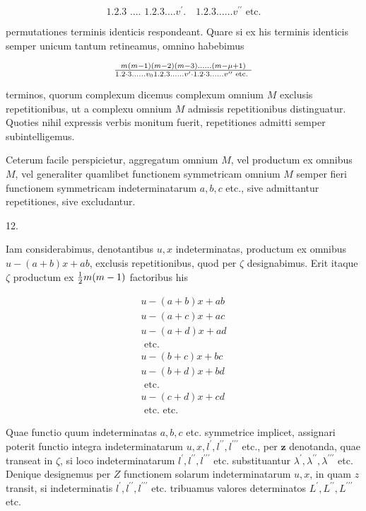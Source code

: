\documentclass[twoside,12pt, showframe]{memoir}
\let\oldfrac\frac
\def\frac#1#2{\mathchoice{\tfrac{#1}{#2}}{\oldfrac{#1}{#2}}{\genfrac{}{}{}{2}{#1}{#2\mathstrut}}{\genfrac{}{}{}{3}{#1}{#2\mathstrut}}}
\begin{document}
\[
\text { 1.2.3 .... } 1.2 .3 \ldots . v^{\prime} . \quad 1.2 .3 \ldots \ldots v^{\prime \prime} \text { etc. }
\]

permutationes terminis identicis respondeant. Quare si ex his terminis identicis semper unicum tantum retineamus, omnino habebimus

\[
\frac{m(m-1)(m-2)(m-3) \ldots \ldots(m-\mu+1)}{1.2 \cdot 3 \ldots \ldots v_{0} 1.2 .3 \ldots \ldots v^{\prime} \cdot 1.2 \cdot 3 \ldots \ldots v^{\prime \prime} \text { etc. }}
\]

terminos, quorum complexum dicemus complexum omnium \(M\) exclusis repetitionibus, ut a complexu omnium \(M\) admissis repetitionibus distinguatur. Quoties nihil expressis verbis monitum fuerit, repetitiones admitti semper subintelligemus.

Ceterum facile perspicietur, aggregatum omnium \(M\), vel productum ex omnibus \(M\), vel generaliter quamlibet functionem symmetricam omnium \(M\) semper fieri functionem symmetricam indeterminatarum \(a, b, c\) etc., sive admittantur repetitiones, sive excludantur.

12.

Iam considerabimus, denotantibus \(u, x\) indeterminatas, productum ex omnibus \(u-(a+b) x+a b\), exclusis repetitionibus, quod per \(\zeta\) designabimus. Erit itaque \(\zeta\) productum ex \(\frac{1}{2} m(m-1)\) factoribus his

\[
\begin{gathered}
u-(a+b) x+a b \\
u-(a+c) x+a c \\
u-(a+d) x+a d \\
\text { etc. } \\
u-(b+c) x+b c \\
u-(b+d) x+b d \\
\text { etc. } \\
u-(c+d) x+c d \\
\text { etc. etc. }
\end{gathered}
\]

Quae functio quum indeterminatas \(a, b, c\) etc. symmetrice implicet, assignari poterit functio integra indeterminatarum \(u, x, l^{\prime}, l^{\prime \prime}, l^{\prime \prime \prime}\) etc., per \(\boldsymbol{z}\) denotanda, quae transeat in \(\zeta\), si loco indeterminatarum \(l^{\prime}, l^{\prime \prime}, l^{\prime \prime \prime}\) etc. substituantur \(\lambda^{\prime}, \lambda^{\prime \prime}, \lambda^{\prime \prime \prime}\) etc. Denique designemus per \(Z\) functionem solarum indeterminatarum \(u, x\), in quam \(z\) transit, si indeterminatis \(l^{\prime}, l^{\prime \prime}, l^{\prime \prime \prime}\) etc. tribuamus valores determinatos \(L^{\prime}, L^{\prime \prime}, L^{\prime \prime \prime}\) etc.
\end{document}
